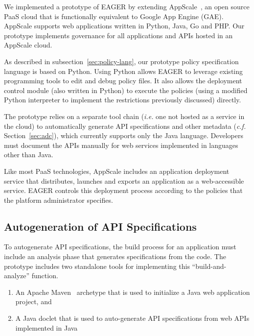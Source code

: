 We implemented a prototype of EAGER by extending AppScale~\cite{appscale13}, 
an open source PaaS cloud that is 
functionally equivalent to Google App Engine (GAE).  AppScale supports
web applications written in Python, Java, Go and PHP. Our prototype
implements governance for all applications and APIs hosted in an AppScale cloud. 

As described in subsection~\ref{sec:policy-lang}, 
our prototype policy specification
language is based on Python.
Using Python allows EAGER to leverage
existing programming tools to edit and debug policy files. 
It also allows the deployment control module (also written in Python) to
execute the policies (using a modified Python interpreter to implement the
restrictions previously discussed) directly.


The prototype relies on a separate tool chain ({\em i.e.} one not hosted as a
service in the cloud) to automatically generate
API specifications and other metadata ({\em c.f.} Section~\ref{sec:adc}), which
currently supports only the Java language.  
Developers must document the APIs manually
for web services implemented in languages other than Java.

Like most PaaS technologies, AppScale includes an application deployment
service that distributes, launches and exports an application
as a web-accessible service.  EAGER controls this deployment
process according to the policies that the platform administrator specifies.

\subsection{Autogeneration of API Specifications}
To autogenerate API specifications, the build process for an application must
include an analysis phase that generates specifications from the code.
The prototype includes two standalone tools for implementing this
``build-and-analyze'' function.
\begin{enumerate}
\vspace{0.05in}
\item An Apache Maven~\cite{maven} archetype that is used to initialize a Java
web application project, and 
\vspace{0.05in}
\item A Java doclet that is used to auto-generate API specifications from web APIs implemented in Java
\vspace{0.05in}
\end{enumerate}

